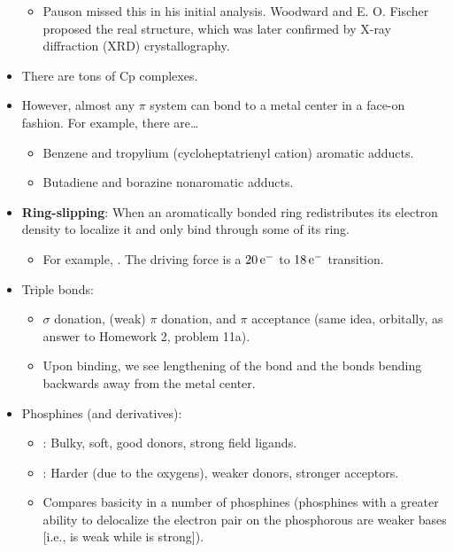 \documentclass[../notes.tex]{subfiles}
\begin{document}
\begin{itemize}
\begin{itemize}
        \item Pauson missed this in his initial analysis. Woodward and E. O. Fischer proposed the real structure, which was later confirmed by X-ray diffraction (XRD) crystallography.
    \end{itemize}
    \item There are tons of Cp complexes.
    \item However, almost any $\pi$ system can bond to a metal center in a face-on fashion. For example, there are\dots
    \begin{itemize}
        \item Benzene and tropylium (cycloheptatrienyl cation) aromatic adducts.
        \item Butadiene and borazine nonaromatic adducts.
    \end{itemize}
    \item \textbf{Ring-slipping}: When an aromatically bonded ring redistributes its electron density to localize it and only bind through some of its ring.
    \begin{itemize}
        \item For example, . The driving force is a $20\,\e[-]$ to $18\,\e[-]$ transition.
    \end{itemize}
    \item Triple bonds:
    \begin{itemize}
        \item $\sigma$ donation, (weak) $\pi$ donation, and $\pi$ acceptance (same idea, orbitally, as answer to Homework 2, problem 11a).
        \item Upon binding, we see lengthening of the  bond and the  bonds bending backwards away from the metal center.
    \end{itemize}
    \item Phosphines (and derivatives):
    \begin{itemize}
        \item {}: Bulky, soft, good donors, strong field ligands.
        \item {}: Harder (due to the oxygens), weaker donors, stronger acceptors.
        \item Compares basicity in a number of phosphines (phosphines with a greater ability to delocalize the electron pair on the phosphorous are weaker bases [i.e.,  is weak while  is strong]).
    \end{itemize}

\end{itemize}
\end{document}
